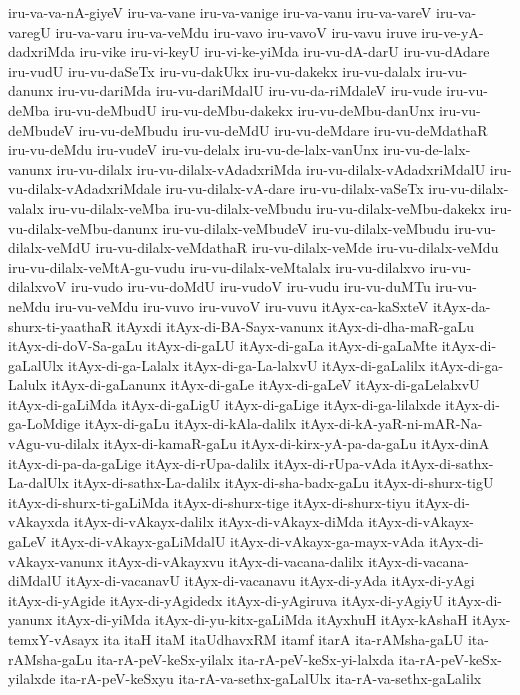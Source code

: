 {iru-va-va-nA-giyeV
iru-va-vane
iru-va-vanige
iru-va-vanu
iru-va-vareV
iru-va-varegU
iru-va-varu
iru-va-veMdu
iru-vavo
iru-vavoV
iru-vavu
iruve
iru-ve-yA-dadxriMda
iru-vike
iru-vi-keyU
iru-vi-ke-yiMda
iru-vu-dA-darU
iru-vu-dAdare
iru-vudU
iru-vu-daSeTx
iru-vu-dakUkx
iru-vu-dakekx
iru-vu-dalalx
iru-vu-danunx
iru-vu-dariMda
iru-vu-dariMdalU
iru-vu-da-riMdaleV
iru-vude
iru-vu-deMba
iru-vu-deMbudU
iru-vu-deMbu-dakekx
iru-vu-deMbu-danUnx
iru-vu-deMbudeV
iru-vu-deMbudu
iru-vu-deMdU
iru-vu-deMdare
iru-vu-deMdathaR
iru-vu-deMdu
iru-vudeV
iru-vu-delalx
iru-vu-de-lalx-vanUnx
iru-vu-de-lalx-vanunx
iru-vu-dilalx
iru-vu-dilalx-vAdadxriMda
iru-vu-dilalx-vAdadxriMdalU
iru-vu-dilalx-vAdadxriMdale
iru-vu-dilalx-vA-dare
iru-vu-dilalx-vaSeTx
iru-vu-dilalx-valalx
iru-vu-dilalx-veMba
iru-vu-dilalx-veMbudu
iru-vu-dilalx-veMbu-dakekx
iru-vu-dilalx-veMbu-danunx
iru-vu-dilalx-veMbudeV
iru-vu-dilalx-veMbudu
iru-vu-dilalx-veMdU
iru-vu-dilalx-veMdathaR
iru-vu-dilalx-veMde
iru-vu-dilalx-veMdu
iru-vu-dilalx-veMtA-gu-vudu
iru-vu-dilalx-veMtalalx
iru-vu-dilalxvo
iru-vu-dilalxvoV
iru-vudo
iru-vu-doMdU
iru-vudoV
iru-vudu
iru-vu-duMTu
iru-vu-neMdu
iru-vu-veMdu
iru-vuvo
iru-vuvoV
iru-vuvu
itAyx-ca-kaSxteV
itAyx-da-shurx-ti-yaathaR
itAyxdi
itAyx-di-BA-Sayx-vanunx
itAyx-di-dha-maR-gaLu
itAyx-di-doV-Sa-gaLu
itAyx-di-gaLU
itAyx-di-gaLa
itAyx-di-gaLaMte
itAyx-di-gaLalUlx
itAyx-di-ga-Lalalx
itAyx-di-ga-La-lalxvU
itAyx-di-gaLalilx
itAyx-di-ga-Lalulx
itAyx-di-gaLanunx
itAyx-di-gaLe
itAyx-di-gaLeV
itAyx-di-gaLelalxvU
itAyx-di-gaLiMda
itAyx-di-gaLigU
itAyx-di-gaLige
itAyx-di-ga-lilalxde
itAyx-di-ga-LoMdige
itAyx-di-gaLu
itAyx-di-kAla-dalilx
itAyx-di-kA-yaR-ni-mAR-Na-vAgu-vu-dilalx
itAyx-di-kamaR-gaLu
itAyx-di-kirx-yA-pa-da-gaLu
itAyx-dinA
itAyx-di-pa-da-gaLige
itAyx-di-rUpa-dalilx
itAyx-di-rUpa-vAda
itAyx-di-sathx-La-dalUlx
itAyx-di-sathx-La-dalilx
itAyx-di-sha-badx-gaLu
itAyx-di-shurx-tigU
itAyx-di-shurx-ti-gaLiMda
itAyx-di-shurx-tige
itAyx-di-shurx-tiyu
itAyx-di-vAkayxda
itAyx-di-vAkayx-dalilx
itAyx-di-vAkayx-diMda
itAyx-di-vAkayx-gaLeV
itAyx-di-vAkayx-gaLiMdalU
itAyx-di-vAkayx-ga-mayx-vAda
itAyx-di-vAkayx-vanunx
itAyx-di-vAkayxvu
itAyx-di-vacana-dalilx
itAyx-di-vacana-diMdalU
itAyx-di-vacanavU
itAyx-di-vacanavu
itAyx-di-yAda
itAyx-di-yAgi
itAyx-di-yAgide
itAyx-di-yAgidedx
itAyx-di-yAgiruva
itAyx-di-yAgiyU
itAyx-di-yanunx
itAyx-di-yiMda
itAyx-di-yu-kitx-gaLiMda
itAyxhuH
itAyx-kAshaH
itAyx-temxY-vAsayx
ita
itaH
itaM
itaUdhavxRM
itamf
itarA
ita-rAMsha-gaLU
ita-rAMsha-gaLu
ita-rA-peV-keSx-yilalx
ita-rA-peV-keSx-yi-lalxda
ita-rA-peV-keSx-yilalxde
ita-rA-peV-keSxyu
ita-rA-va-sethx-gaLalUlx
ita-rA-va-sethx-gaLalilx
}
